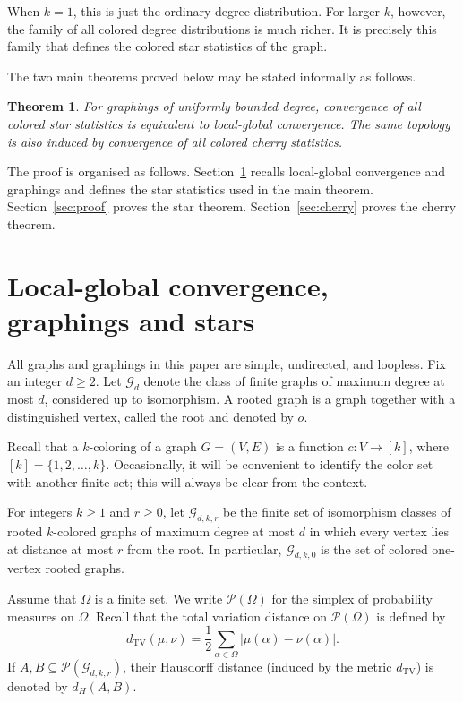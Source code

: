 \documentclass[11pt]{amsart}
\newcommand{\calG}{\mathcal G}
\newcommand{\calP}{\mathcal P}
\newcommand{\TV}{\operatorname{TV}}
\newtheorem*{theorem*}{Theorem}
\theoremstyle{remark}
\begin{document}
When $k=1$, this is just the ordinary degree distribution.  For larger $k$, however, the family of all colored degree distributions is much richer.  It is precisely this family that defines the colored star statistics of the graph.

The two main theorems proved below may be stated informally as follows.

\begin{theorem*}
For graphings of uniformly bounded degree, convergence of all colored star statistics is equivalent to local-global convergence. The same topology is also induced by convergence of all colored cherry statistics.
\end{theorem*}

The proof is organised as follows. Section~\ref{sec:local-global} recalls local-global convergence and graphings and defines the star statistics used in the main theorem. Section~\ref{sec:proof} proves the star theorem. Section~\ref{sec:cherry} proves the cherry theorem. 

\section{Local-global convergence, graphings and stars}\label{sec:local-global}

All graphs and graphings in this paper are simple, undirected, and loopless. Fix an integer $d\geq 2$. Let $\calG_d$ denote the class of finite graphs of maximum degree at most $d$, considered up to isomorphism. A rooted graph is a graph together with a distinguished vertex, called the root and denoted by $o$.

Recall that a $k$-coloring of a graph $G=(V,E)$ is a function $c\colon V\to [k]$, where $[k]=\{1,2,\dots,k\}$. Occasionally, it will be convenient to identify the color set with another finite set; this will always be clear from the context.

For integers $k\geq 1$ and $r\geq 0$, let $\calG_{d,k,r}$ be the finite set of isomorphism classes of rooted $k$-colored graphs of maximum degree at most $d$ in which every vertex lies at distance at most $r$ from the root. In particular, $\calG_{d,k,0}$ is the set of colored one-vertex rooted graphs.

Assume that $\Omega$ is a finite set. We write $\calP(\Omega)$ for the simplex of probability measures on $\Omega$. Recall that the total variation distance on $\calP(\Omega)$ is defined by
\[
 d_{\TV}(\mu,\nu)=\frac12\sum_{\alpha\in\Omega}|\mu(\alpha)-\nu(\alpha)|.
\]
If $A,B\subseteq\calP(\calG_{d,k,r})$, their Hausdorff distance (induced by the metric $d_{\TV}$) is denoted by $d_H(A,B)$.
\end{document}
